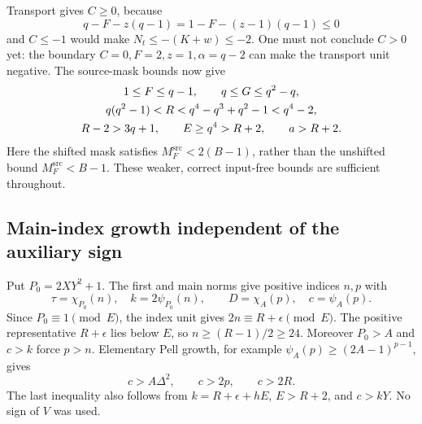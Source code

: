 \documentclass[11pt,a4paper]{article}
\theoremstyle{remark}\newtheorem{remark}[theorem]{Remark}
\newcommand{\Msrc}{M_F^{\mathrm{src}}}
\begin{document}
Transport gives \(C\ge0\), because
\[
 q-F-z(q-1)=1-F-(z-1)(q-1)\le0
\]
and \(C\le-1\) would make \(N_t\le-(K+w)\le-2\).
One must not conclude \(C>0\) yet: the boundary
\(C=0,F=2,z=1,\alpha=q-2\) can make the transport unit negative.
The source-mask bounds now give
\begin{gather}
 1\le F\le q-1,\qquad q\le G\le q^2-q,\notag\\
 q(q^2-1)<R<q^4-q^3+q^2-1<q^4-2,\label{eq:outerbounds}\\
 R-2>3q+1,\qquad E\ge q^4>R+2,\qquad a>R+2.
\notag
\end{gather}
Here the shifted mask satisfies \(\Msrc<2(B-1)\), rather than
the unshifted bound \(\Msrc<B-1\). These weaker, correct input-free
bounds are sufficient throughout.

\subsection{Main-index growth independent of the auxiliary sign}
Put \(P_0=2XY^2+1\). The first and main norms give positive indices
\(n,p\) with
\[
 \tau=\chi_{P_0}(n),\quad k=2\psi_{P_0}(n),\qquad
 D=\chi_A(p),\quad c=\psi_A(p).
\]
Since \(P_0\equiv1\pmod E\), the index unit gives
\(2n\equiv R+\epsilon\pmod E\). The positive representative
\(R+\epsilon\) lies below \(E\), so
\(n\ge(R-1)/2\ge24\). Moreover \(P_0>A\) and \(c>k\)
force \(p>n\). Elementary Pell growth, for example
\(\psi_A(p)\ge(2A-1)^{p-1}\), gives
\begin{equation}
 c>A\Delta^2,\qquad c>2p,\qquad c>2R.\label{eq:growth}
\end{equation}
The last inequality also follows from \(k=R+\epsilon+hE\),
\(E>R+2\), and \(c>kY\). No sign of \(V\) was used.
\end{document}
